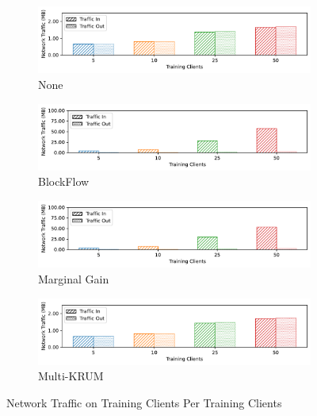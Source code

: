 \begin{figure}[!ht]
    \centering
    \begin{subfigure}[b]{0.49\textwidth}
        \centering
        \includegraphics[width=\textwidth]{graphics/clients/net_none_client.pdf}
        \caption{None}
    \end{subfigure}
    \hfill
    \begin{subfigure}[b]{0.49\textwidth}
        \centering
        \includegraphics[width=\textwidth]{graphics/clients/net_blockflow_client.pdf}
        \caption{BlockFlow}
    \end{subfigure}
    \hfill
    \begin{subfigure}[b]{0.49\textwidth}
        \centering
        \includegraphics[width=\textwidth]{graphics/clients/net_marginalgain_client.pdf}
        \caption{Marginal Gain}
    \end{subfigure}
    \hfill
    \begin{subfigure}[b]{0.49\textwidth}
        \centering
        \includegraphics[width=\textwidth]{graphics/clients/net_multikrum_client.pdf}
        \caption{Multi-KRUM}
    \end{subfigure}
    \caption{Network Traffic on Training Clients Per Training Clients}
    \label{fig:net_clients_degree_clients}
\end{figure}

